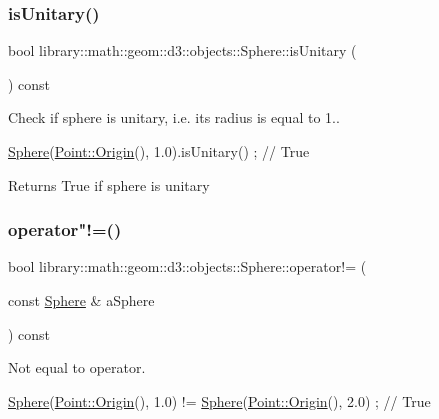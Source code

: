 \subsubsection{\texorpdfstring{is\+Unitary()}{isUnitary()}}
{\footnotesize\ttfamily bool library\+::math\+::geom\+::d3\+::objects\+::\+Sphere\+::is\+Unitary (\begin{DoxyParamCaption}{ }\end{DoxyParamCaption}) const}



Check if sphere is unitary, i.\+e. its radius is equal to 1.. 


\begin{DoxyCode}
\hyperlink{classlibrary_1_1math_1_1geom_1_1d3_1_1objects_1_1_sphere_a55dccc8ea16ee55cd7694c26afa8ea39}{Sphere}(\hyperlink{classlibrary_1_1math_1_1geom_1_1d3_1_1objects_1_1_point_ab2a38e285c562e50bf350272c083986f}{Point::Origin}(), 1.0).isUnitary() ; \textcolor{comment}{// True}
\end{DoxyCode}


\begin{DoxyReturn}{Returns}
True if sphere is unitary 
\end{DoxyReturn}
\mbox{\label{classlibrary_1_1math_1_1geom_1_1d3_1_1objects_1_1_sphere_a127131c48a3bfe342508630cfd399fae}} 
\subsubsection{\texorpdfstring{operator"!=()}{operator!=()}}
{\footnotesize\ttfamily bool library\+::math\+::geom\+::d3\+::objects\+::\+Sphere\+::operator!= (\begin{DoxyParamCaption}\item[{const \hyperlink{classlibrary_1_1math_1_1geom_1_1d3_1_1objects_1_1_sphere}{Sphere} \&}]{a\+Sphere }\end{DoxyParamCaption}) const}



Not equal to operator. 


\begin{DoxyCode}
\hyperlink{classlibrary_1_1math_1_1geom_1_1d3_1_1objects_1_1_sphere_a55dccc8ea16ee55cd7694c26afa8ea39}{Sphere}(\hyperlink{classlibrary_1_1math_1_1geom_1_1d3_1_1objects_1_1_point_ab2a38e285c562e50bf350272c083986f}{Point::Origin}(), 1.0) != \hyperlink{classlibrary_1_1math_1_1geom_1_1d3_1_1objects_1_1_sphere_a55dccc8ea16ee55cd7694c26afa8ea39}{Sphere}(\hyperlink{classlibrary_1_1math_1_1geom_1_1d3_1_1objects_1_1_point_ab2a38e285c562e50bf350272c083986f}{Point::Origin}(), 2.0) ; \textcolor{comment}{//
       True}
\end{DoxyCode}



